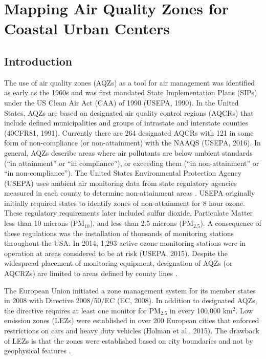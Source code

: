 
\chapter{Mapping Air Quality Zones for Coastal Urban Centers}

\section{Introduction}
The use of air quality zones (AQZs) as a tool for air management was identified as early as the 1960s \citep{Breivogel1961, Holland1960} and was first mandated State Implementation Plans (SIPs) under the US Clean Air Act (CAA) of 1990 (USEPA, 1990). In the United States, AQZs are based on designated air quality control regions (AQCRs) that include defined municipalities and groups of intrastate and interstate counties (40CFR81, 1991). Currently there are 264 designated AQCRs with 121 in some form of non-compliance (or non-attainment) with the NAAQS (USEPA, 2016). In general, AQZs describe areas where air pollutants are below ambient standards (“in attainment” or “in compliance”), or exceeding them (“in non-attainment” or “in non-compliance”).  The United States Environmental Protection Agency (USEPA) uses ambient air monitoring data from state regulatory agencies measured in each county to determine non-attainment areas \citep{Carr2012}.  USEPA originally initially required states to identify zones of non-attainment for 8 hour ozone.  These regulatory requirements later included sulfur dioxide, Particulate Matter less than 10 microns (PM$_{10}$), and less than 2.5 microns (PM$_{2.5}$).  A consequence of these regulations was the installation of thousands of monitoring stations throughout the USA.  In 2014, 1,293 active ozone monitoring stations were in operation at areas considered to be at risk (USEPA, 2015).  Despite the widespread placement of monitoring equipment, designation of AQZs (or AQCRZs) are limited to areas defined by county lines \citep{Carr2012}.

The European Union initiated a zone management system for its member states in 2008 with Directive 2008/50/EC (EC, 2008).  In addition to designated AQZs, the directive requires at least one monitor for PM$_{2.5}$ in every 100,000 km$^{2}$.  Low emission zones (LEZs) were established in over 200 European cities that enforced restrictions on cars and heavy duty vehicles (Holman et al., 2015).  The drawback of LEZs is that the zones were established based on city boundaries and not by geophysical features \citep{Henschel2013}.

